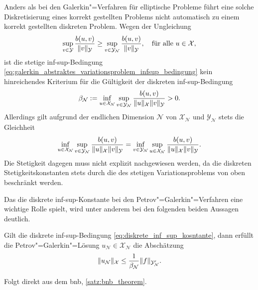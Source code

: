 \documentclass[../main.tex]{subfiles}
\begin{document}
\begin{Bemerkung}\label{bemerkung:zur_wohldefiniertheit}
    Anders als bei den Galerkin"=Verfahren für elliptische Probleme führt eine solche Diskretisierung eines korrekt gestellten Problems nicht automatisch zu einem korrekt gestellten diskreten Problem.
    Wegen der Ungleichung
    \begin{equation}
        \sup_{v \in \mathcal Y} \frac{b(u, v)}{\norm{v}_{\mathcal Y}} \geq \sup_{v \in \mathcal Y_{\mathcal N}} \frac{b(u, v)}{\norm{v}_{\mathcal Y}}, \quad \fa u \in \mathcal X,
    \end{equation}
    ist die stetige inf-sup-Bedingung \cref{eq:galerkin_abstraktes_variationsproblem_infsup_bedingung} kein hinreichendes Kriterium für die Gültigkeit der diskreten inf-sup-Bedingung
    \begin{equation}\label{eq:diskrete_inf_sup_kosntante}
        \beta_{\mathcal N} := \inf_{u \in \mathcal X_{\mathcal N}} \sup_{v \in \mathcal Y_{\mathcal N}} \frac{b(u, v)}{\norm{u}_{\mathcal X} \norm{v}_{\mathcal Y}} > 0.
    \end{equation}
    Allerdings gilt aufgrund der endlichen Dimension $\mathcal N$ von $\mathcal X_{\mathcal N}$ und $\mathcal Y_{\mathcal N}$ stets die Gleichheit
    \begin{equation}
        \inf_{u \in \mathcal X_{\mathcal N}} \sup_{v \in \mathcal Y_{\mathcal N}} \frac{b(u, v)}{\norm{u}_{\mathcal X} \norm{v}_{\mathcal Y}} = \inf_{v \in \mathcal Y_{\mathcal N}} \sup_{u \in \mathcal X_{\mathcal N}} \frac{b(u, v)}{\norm{u}_{\mathcal X} \norm{v}_{\mathcal Y}}.
    \end{equation}
    Die Stetigkeit dagegen muss nicht explizit nachgewiesen werden, da die diskreten Stetigkeitskonstanten stets durch die des stetigen Variationsproblems von oben beschränkt werden.
\end{Bemerkung}

Das die diskrete inf-sup-Konstante bei den Petrov"=Galerkin"=Verfahren eine wichtige Rolle spielt, wird unter anderem bei den folgenden beiden Aussagen deutlich.

\begin{Satz}\label{satz:galerkin_stabilitaet}
    Gilt die diskrete inf-sup-Bedingung \cref{eq:diskrete_inf_sup_kosntante}, dann erfüllt die Petrov"=Galerkin"=Lösung $u_{\mathcal N} \in \mathcal X_{\mathcal N}$ die Abschätzung
    \begin{equation}\label{eq:galerkin_statibilitaet}
        \norm{u_{\mathcal N}}_{\mathcal X} \leq \frac{1}{\beta_{\mathcal N}} \norm{f}_{\mathcal Y_{\mathcal N}'}.
    \end{equation}

    \begin{Beweis}
        Folgt direkt aus dem \acl{bnb}, \cref{satz:bnb_theorem}.
    \end{Beweis}
\end{Satz}
\end{document}
